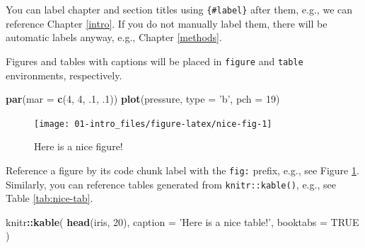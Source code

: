 \documentclass[]{book}
\newenvironment{Shaded}{\begin{snugshade}}{\end{snugshade}}
\newcommand{\KeywordTok}[1]{\textcolor[rgb]{0.13,0.29,0.53}{\textbf{#1}}}
\newcommand{\DataTypeTok}[1]{\textcolor[rgb]{0.13,0.29,0.53}{#1}}
\newcommand{\DecValTok}[1]{\textcolor[rgb]{0.00,0.00,0.81}{#1}}
\newcommand{\StringTok}[1]{\textcolor[rgb]{0.31,0.60,0.02}{#1}}
\newcommand{\OtherTok}[1]{\textcolor[rgb]{0.56,0.35,0.01}{#1}}
\newcommand{\OperatorTok}[1]{\textcolor[rgb]{0.81,0.36,0.00}{\textbf{#1}}}
\newcommand{\NormalTok}[1]{#1}
\begin{document}
You can label chapter and section titles using \texttt{\{\#label\}}
after them, e.g., we can reference Chapter \ref{intro}. If you do not
manually label them, there will be automatic labels anyway, e.g.,
Chapter \ref{methods}.

Figures and tables with captions will be placed in \texttt{figure} and
\texttt{table} environments, respectively.

\begin{Shaded}
\begin{Highlighting}[]
\KeywordTok{par}\NormalTok{(}\DataTypeTok{mar =} \KeywordTok{c}\NormalTok{(}\DecValTok{4}\NormalTok{, }\DecValTok{4}\NormalTok{, .}\DecValTok{1}\NormalTok{, .}\DecValTok{1}\NormalTok{))}
\KeywordTok{plot}\NormalTok{(pressure, }\DataTypeTok{type =} \StringTok{'b'}\NormalTok{, }\DataTypeTok{pch =} \DecValTok{19}\NormalTok{)}
\end{Highlighting}
\end{Shaded}

\begin{figure}

{\centering \texttt{[image: 01-intro\_files/figure-latex/nice-fig-1]} 

}

\caption{Here is a nice figure!}\label{fig:nice-fig}
\end{figure}

Reference a figure by its code chunk label with the \texttt{fig:}
prefix, e.g., see Figure \ref{fig:nice-fig}. Similarly, you can
reference tables generated from \texttt{knitr::kable()}, e.g., see Table
\ref{tab:nice-tab}.

\begin{Shaded}
\begin{Highlighting}[]
\NormalTok{knitr}\OperatorTok{::}\KeywordTok{kable}\NormalTok{(}
  \KeywordTok{head}\NormalTok{(iris, }\DecValTok{20}\NormalTok{), }\DataTypeTok{caption =} \StringTok{'Here is a nice table!'}\NormalTok{,}
  \DataTypeTok{booktabs =} \OtherTok{TRUE}
\NormalTok{)}
\end{Highlighting}
\end{Shaded}
\end{document}
